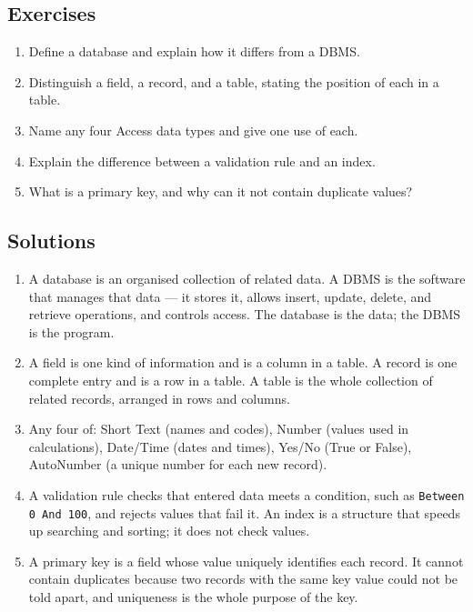 \subsection*{Exercises}
\begin{enumerate}[label=\arabic*.]
  \item Define a database and explain how it differs from a DBMS.
  \item Distinguish a field, a record, and a table, stating the position of
    each in a table.
  \item Name any four Access data types and give one use of each.
  \item Explain the difference between a validation rule and an index.
  \item What is a primary key, and why can it not contain duplicate values?
\end{enumerate}

\subsection*{Solutions}
\begingroup\small
\begin{enumerate}[label=\arabic*.]
  \item A database is an organised collection of related data. A DBMS is the
    software that manages that data --- it stores it, allows insert, update,
    delete, and retrieve operations, and controls access. The database is the
    data; the DBMS is the program.
  \item A field is one kind of information and is a column in a table. A
    record is one complete entry and is a row in a table. A table is the
    whole collection of related records, arranged in rows and columns.
  \item Any four of: Short Text (names and codes), Number (values used in
    calculations), Date/Time (dates and times), Yes/No (True or False),
    AutoNumber (a unique number for each new record).
  \item A validation rule checks that entered data meets a condition, such as
    \texttt{Between 0 And 100}, and rejects values that fail it. An index is a
    structure that speeds up searching and sorting; it does not check values.
  \item A primary key is a field whose value uniquely identifies each record.
    It cannot contain duplicates because two records with the same key value
    could not be told apart, and uniqueness is the whole purpose of the key.
\end{enumerate}
\endgroup

